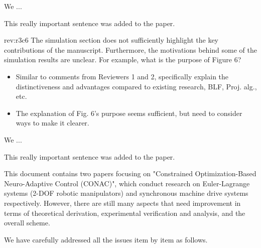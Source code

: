\documentclass[12pt,english]{reviewresponse}
\begin{document}
\begin{revresponse}
    We ...
    \begin{changes}
        This really important sentence was added to the paper.
    \end{changes}
\end{revresponse}

\begin{revcomment}[1]{rev:r3c6}
    The simulation section does not sufficiently highlight the key contributions of the manuscript. Furthermore, the motivations behind some of the simulation results are unclear. For example, what is the purpose of Figure 6?
\end{revcomment}

\begin{howtoanswer}
    \begin{itemize}
        \item Similar to comments from Reviewers 1 and 2, specifically explain the distinctiveness and advantages compared to existing research, BLF, Proj. alg., etc.
        \item The explanation of Fig. 6's purpose seems sufficient, but need to consider ways to make it clearer.
    \end{itemize}
\end{howtoanswer}

\begin{revresponse}
    We ...
    \begin{changes}
        This really important sentence was added to the paper.
    \end{changes}
\end{revresponse}

\reviewer
\begin{generalcomment}
    This document contains two papers focusing on "Constrained Optimization-Based Neuro-Adaptive Control (CONAC)", which conduct research on Euler-Lagrange systems (2-DOF robotic manipulators) and synchronous machine drive systems respectively. However, there are still many aspects that need improvement in terms of theoretical derivation, experimental verification and analysis, and the overall scheme.
\end{generalcomment}
\begin{revresponse}
    We have carefully addressed all the issues item by item as follows.
\end{revresponse}
\end{document}
